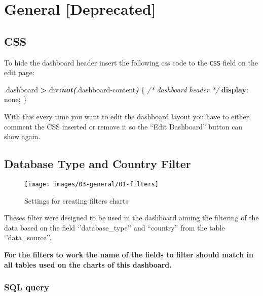 \documentclass[
]{book}
\newenvironment{Shaded}{\begin{snugshade}}{\end{snugshade}}
\newcommand{\CommentTok}[1]{\textcolor[rgb]{0.56,0.35,0.01}{\textit{#1}}}
\newcommand{\DecValTok}[1]{\textcolor[rgb]{0.00,0.00,0.81}{#1}}
\newcommand{\FunctionTok}[1]{\textcolor[rgb]{0.00,0.00,0.00}{#1}}
\newcommand{\InformationTok}[1]{\textcolor[rgb]{0.56,0.35,0.01}{\textbf{\textit{#1}}}}
\newcommand{\KeywordTok}[1]{\textcolor[rgb]{0.13,0.29,0.53}{\textbf{#1}}}
\newcommand{\NormalTok}[1]{#1}
\newcommand{\OperatorTok}[1]{\textcolor[rgb]{0.81,0.36,0.00}{\textbf{#1}}}
\begin{document}
\hypertarget{general-deprecated}{%
\section{General {[}Deprecated{]}}\label{general-deprecated}}

\hypertarget{css-2}{%
\subsection*{CSS}\label{css-2}}

To hide the dashboard header insert the following css code to the \texttt{CSS} field on the edit page:

\begin{Shaded}
\begin{Highlighting}[]
\FunctionTok{.dashboard} \OperatorTok{\textgreater{}}\NormalTok{ div}\InformationTok{:not(}\FunctionTok{.dashboard{-}content}\InformationTok{)}\NormalTok{ \{  }\CommentTok{/* dashboard header */}
  \KeywordTok{display}\NormalTok{: }\DecValTok{none}\OperatorTok{;}
\NormalTok{\}}
\end{Highlighting}
\end{Shaded}

With this every time you want to edit the dashboard layout you have to either comment the CSS inserted
or remove it so the ``Edit Dashboard'' button can show again.

\hypertarget{database-type-and-country-filter}{%
\subsection*{Database Type and Country Filter}\label{database-type-and-country-filter}}

\begin{figure}
\texttt{[image: images/03-general/01-filters]} \caption{Settings for creating filters charts}\label{fig:filters}
\end{figure}

Theses filter were designed to be used in the dashboard aiming the filtering of the data based on the field `'database\_type'' and ``country'' from the table `'data\_source''.

\textbf{For the filters to work the name of the fields to filter should match in all tables used on the charts of this dashboard.}

\hypertarget{sql-query-8}{%
\subsubsection*{SQL query}\label{sql-query-8}}
\end{document}
